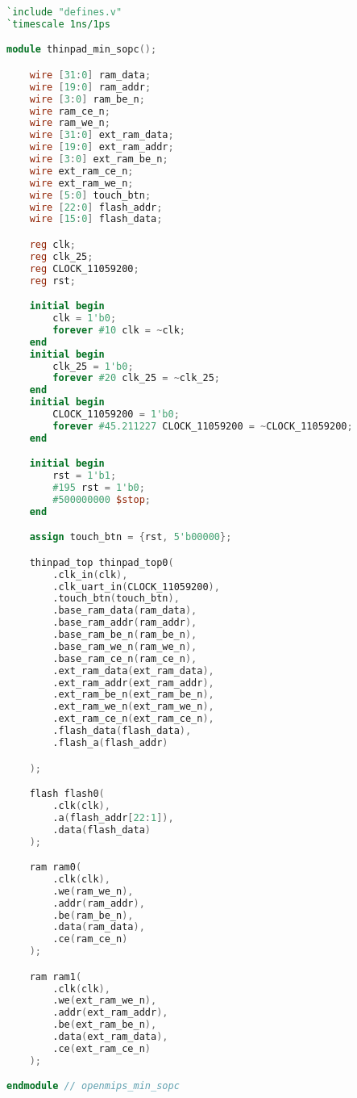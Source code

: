 \begin{lstlisting}[language=verilog, caption={仿真测试顶层文件thinpad\_min\_sopc.v}]
`include "defines.v"
`timescale 1ns/1ps

module thinpad_min_sopc();

    wire [31:0] ram_data;
    wire [19:0] ram_addr;
    wire [3:0] ram_be_n;
    wire ram_ce_n;
    wire ram_we_n;
    wire [31:0] ext_ram_data;
    wire [19:0] ext_ram_addr;
    wire [3:0] ext_ram_be_n;
    wire ext_ram_ce_n;
    wire ext_ram_we_n;
    wire [5:0] touch_btn;
    wire [22:0] flash_addr;
    wire [15:0] flash_data;

    reg clk;
    reg clk_25;
    reg CLOCK_11059200;
    reg rst;

    initial begin
        clk = 1'b0;
        forever #10 clk = ~clk;
    end
    initial begin
        clk_25 = 1'b0;
        forever #20 clk_25 = ~clk_25;
    end
    initial begin
        CLOCK_11059200 = 1'b0;
        forever #45.211227 CLOCK_11059200 = ~CLOCK_11059200;
    end

    initial begin
        rst = 1'b1;
        #195 rst = 1'b0;
        #500000000 $stop;
    end

    assign touch_btn = {rst, 5'b00000};

    thinpad_top thinpad_top0(
        .clk_in(clk),
        .clk_uart_in(CLOCK_11059200),
        .touch_btn(touch_btn),
        .base_ram_data(ram_data),
        .base_ram_addr(ram_addr),
        .base_ram_be_n(ram_be_n),
        .base_ram_we_n(ram_we_n),
        .base_ram_ce_n(ram_ce_n),
        .ext_ram_data(ext_ram_data),
        .ext_ram_addr(ext_ram_addr),
        .ext_ram_be_n(ext_ram_be_n),
        .ext_ram_we_n(ext_ram_we_n),
        .ext_ram_ce_n(ext_ram_ce_n),
        .flash_data(flash_data),
        .flash_a(flash_addr)

    );

    flash flash0(
        .clk(clk),
        .a(flash_addr[22:1]),
        .data(flash_data)
    );

    ram ram0(
        .clk(clk),
        .we(ram_we_n),
        .addr(ram_addr),
        .be(ram_be_n),
        .data(ram_data),
        .ce(ram_ce_n)
    );

    ram ram1(
        .clk(clk),
        .we(ext_ram_we_n),
        .addr(ext_ram_addr),
        .be(ext_ram_be_n),
        .data(ext_ram_data),
        .ce(ext_ram_ce_n)
    );

endmodule // openmips_min_sopc
\end{lstlisting}


